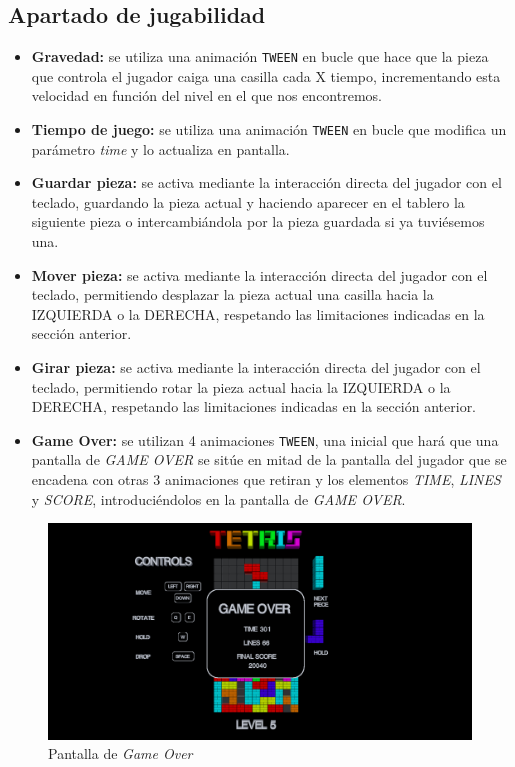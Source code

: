\documentclass[11pt,a4paper]{article}
\begin{document}
    \subsection{Apartado de jugabilidad}
    \begin{itemize}
        \item \textbf{Gravedad:} se utiliza una animación \texttt{TWEEN} en bucle que hace que la pieza que controla el jugador caiga una casilla cada X tiempo, incrementando esta velocidad en función del nivel en el que nos encontremos.
        \item \textbf{Tiempo de juego:} se utiliza una animación \texttt{TWEEN} en bucle que modifica un parámetro \textit{time} y lo actualiza en pantalla.
        \item \textbf{Guardar pieza:} se activa mediante la interacción directa del jugador con el teclado, guardando la pieza actual y haciendo aparecer en el tablero la siguiente pieza o intercambiándola por la pieza guardada si ya tuviésemos una.
        \item \textbf{Mover pieza:} se activa mediante la interacción directa del jugador con el teclado, permitiendo desplazar la pieza actual una casilla hacia la IZQUIERDA o la DERECHA, respetando las limitaciones indicadas en la sección anterior.
        \item \textbf{Girar pieza:} se activa mediante la interacción directa del jugador con el teclado, permitiendo rotar la pieza actual hacia la IZQUIERDA o la DERECHA, respetando las limitaciones indicadas en la sección anterior.
         \item \textbf{Game Over:} se utilizan 4 animaciones \texttt{TWEEN}, una inicial que hará que una pantalla de \textit{GAME OVER} se sitúe en mitad de la pantalla del jugador que se encadena con otras 3 animaciones que retiran y los elementos \textit{TIME}, \textit{LINES} y \textit{SCORE}, introduciéndolos en la pantalla de \textit{GAME OVER}.
    \end{itemize}
    
    \begin{figure}[H]
        \centering
        \includegraphics[scale=0.22]{gameOver.jpg}
        \caption{Pantalla de \textit{Game Over}}
    \end{figure}
\end{document}
